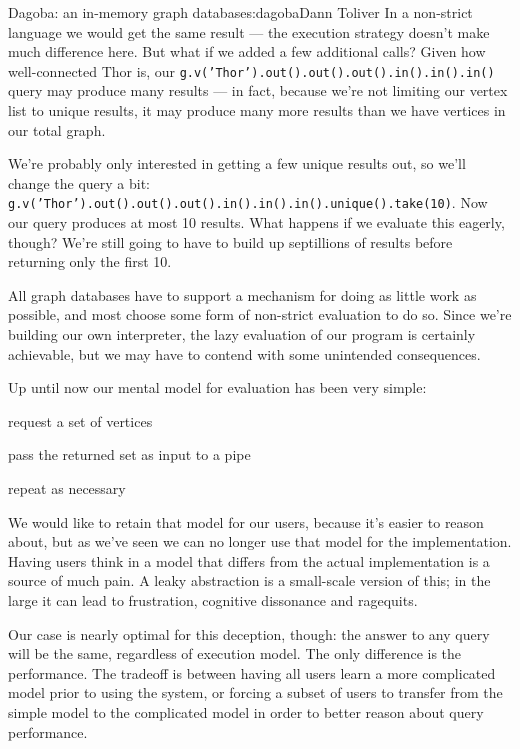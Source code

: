 \begin{aosachapter}{Dagoba: an in-memory graph database}{s:dagoba}{Dann Toliver}
In a non-strict language we would get the same result --- the execution
strategy doesn't make much difference here. But what if we added a few
additional calls? Given how well-connected Thor is, our
\texttt{g.v('Thor').out().out().out().in().in().in()} query may produce
many results --- in fact, because we're not limiting our vertex list to
unique results, it may produce many more results than we have vertices
in our total graph.

We're probably only interested in getting a few unique results out, so
we'll change the query a bit:
\texttt{g.v('Thor').out().out().out().in().in().in().unique().take(10)}.
Now our query produces at most 10 results. What happens if we evaluate
this eagerly, though? We're still going to have to build up septillions
of results before returning only the first 10.

All graph databases have to support a mechanism for doing as little work
as possible, and most choose some form of non-strict evaluation to do
so. Since we're building our own interpreter, the lazy evaluation of our
program is certainly achievable, but we may have to contend with some
unintended consequences.

\label{ramifications-of-evaluation-strategy-on-our-mental-model}

Up until now our mental model for evaluation has been very simple:

\begin{aosaitemize}

\item
  request a set of vertices
\item
  pass the returned set as input to a pipe
\item
  repeat as necessary
\end{aosaitemize}

We would like to retain that model for our users, because it's easier to
reason about, but as we've seen we can no longer use that model for the
implementation. Having users think in a model that differs from the
actual implementation is a source of much pain. A leaky abstraction is a
small-scale version of this; in the large it can lead to frustration,
cognitive dissonance and ragequits.

Our case is nearly optimal for this deception, though: the answer to any
query will be the same, regardless of execution model. The only
difference is the performance. The tradeoff is between having all users
learn a more complicated model prior to using the system, or forcing a
subset of users to transfer from the simple model to the complicated
model in order to better reason about query performance.


\end{aosachapter}
